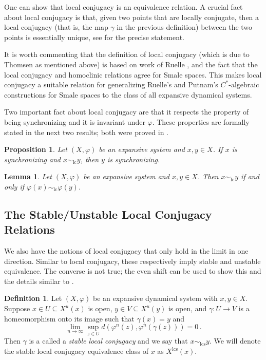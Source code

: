 \documentclass{amsart}
\newcommand{\lc}{\text{lc}}
\newcommand{\lcs}{\text{lcs}}
\theoremstyle{plain}
\newtheorem{lemma}[theorem]{Lemma}
\newtheorem{prop}[theorem]{Proposition}
\theoremstyle{definition}
\newtheorem{definition}[theorem]{Definition}
\theoremstyle{remark}
\begin{document}
One can show that local conjugacy is an equivalence relation. A crucial fact about local conjugacy is that, given two points that are locally conjugate, then a local conjugacy (that is, the map $\gamma$ in the previous definition) between the two points is essentially unique, see \cite[Lemma 1.4]{thomsen2010c} for the precise statement.

It is worth commenting that the definition of local conjugacy (which is due to Thomsen as mentioned above) is based on work of Ruelle \cite{Ruelle1988}, and the fact that the local conjugacy and homoclinic relations agree for Smale spaces. This makes local conjugacy a suitable relation for generalizing Ruelle's and Putnam's $C^\ast$-algebraic constructions for Smale spaces to the class of all expansive dynamical systems.

Two important fact about local conjugacy are that it respects the property of being synchronizing and it is invariant under $\varphi$. These properties are formally stated in the next two results; both were proved in \cite{DeeSto}.

\begin{prop}\label{prop:lc-preserves-sync}
Let $(X,\varphi)$ be an expansive system and $x,y \in X$.  If $x$ is synchronizing and $x \sim_\lc y$, then $y$ is synchronizing.
\end{prop}

\begin{lemma}\label{lem:lc-invariant-under-map}
Let $(X,\varphi)$ be an expansive system and $x,y \in X$.  Then $x \sim_\lc y$ if and only if $\varphi(x) \sim_\lc \varphi(y)$.
\end{lemma}

\subsection{The Stable/Unstable Local Conjugacy Relations}

We also have the notions of local conjugacy that only hold in the limit in one direction.  Similar to local conjugacy, these respectively imply stable and unstable equivalence. The converse is not true; the even shift can be used to show this and the details similar to \cite[Remark 1.13]{thomsen2010c}.

\begin{definition}
Let $(X,\varphi)$ be an expansive dynamical system with $x,y \in X$.  Suppose $x \in U \subseteq X^u(x)$ is open, $y \in V\subseteq X^u(y)$ is open, and $\gamma : U \to V$ is a homeomorphism onto its image such that $\gamma(x) = y$ and \[ \lim_{n \to \infty} \sup_{z \in U} d(\varphi^n(z), \varphi^n(\gamma(z))) = 0 \,. \]  Then $\gamma$ is a called a \emph{stable local conjugacy} and we say that $x \sim_\lcs y$.  We will denote the stable local conjugacy equivalence class of $x$ as $X^\lcs(x)$.
\end{definition}
\end{document}
